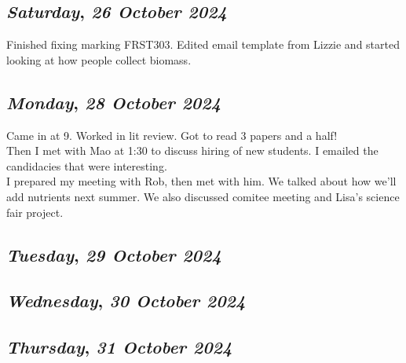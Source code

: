 \def\day{\textit{26 October 2024}}
\def\weekday{\textit{Saturday}}
\subsection*{\weekday, \day}
Finished fixing marking FRST303. Edited email template from Lizzie and started looking at how people collect biomass.

\def\day{\textit{28 October 2024}}
\def\weekday{\textit{Monday}}
\subsection*{\weekday, \day}
Came in at 9. Worked in lit review. Got to read 3 papers and a half! \\
Then I met with Mao at 1:30 to discuss hiring of new students. I emailed the candidacies that were interesting. \\
I prepared my meeting with Rob, then met with him. We talked about how we'll add nutrients next summer. We also discussed comitee meeting and Lisa's science fair project. 
\def\day{\textit{29 October 2024}}
\def\weekday{\textit{Tuesday}}
\subsection*{\weekday, \day}

\def\day{\textit{30 October 2024}}
\def\weekday{\textit{Wednesday}}
\subsection*{\weekday, \day}

\def\day{\textit{31 October 2024}}
\def\weekday{\textit{Thursday}}
\subsection*{\weekday, \day}
